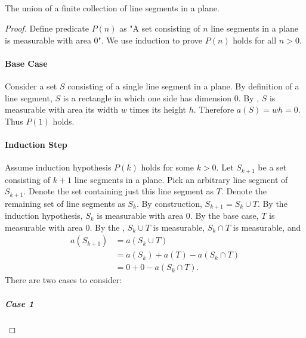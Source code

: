 \documentclass{report}
\begin{document}
\subsection{}%
\label{sub:exercise-1.7.1c}

The union of a finite collection of line segments in a plane.

\begin{proof}

  Define predicate $P(n)$ as "A set consisting of $n$ line segments in a plane
    is measurable with area $0$".
  We use induction to prove $P(n)$ holds for all $n > 0$.

  \paragraph{Base Case}%

    Consider a set $S$ consisting of a single line segment in a plane.
    By definition of a line segment, $S$ is a rectangle in which one side has
      dimension $0$.
    By , $S$ is measurable with area its width $w$
      times its height $h$.
    Therefore $a(S) = wh = 0$.
    Thus $P(1)$ holds.

  \paragraph{Induction Step}%

    Assume induction hypothesis $P(k)$ holds for some $k > 0$.
    Let $S_{k+1}$ be a set consisting of $k + 1$ line segments in a plane.
    Pick an arbitrary line segment of $S_{k+1}$.
    Denote the set containing just this line segment as $T$.
    Denote the remaining set of line segments as $S_k$.
    By construction, $S_{k+1} = S_k \cup T$.
    By the induction hypothesis, $S_k$ is measurable with area $0$.
    By the base case, $T$ is measurable with area $0$.
    By the , $S_k \cup T$ is measurable,
      $S_k \cap T$ is measurable, and
      \begin{align}
        a(S_{k+1})
          & = a(S_k \cup T) \nonumber \\
          & = a(S_k) + a(T) - a(S_k \cap T) \nonumber \\
          & = 0 + 0 - a(S_k \cap T). \label{sub:exercise-1.7.1c-eq1}
      \end{align}
    There are two cases to consider:

    \subparagraph{Case 1}%


\end{proof}
\end{document}
